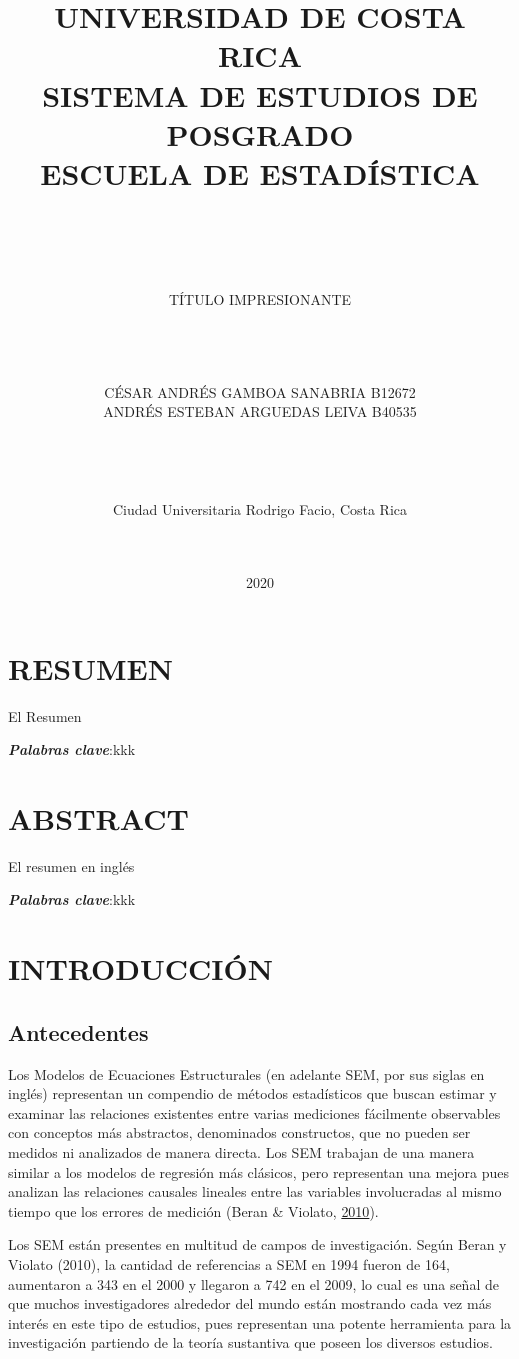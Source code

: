 \documentclass[
]{article}
\title{UNIVERSIDAD DE COSTA RICA\\
SISTEMA DE ESTUDIOS DE POSGRADO\\
ESCUELA DE ESTADÍSTICA\\
~\\
~\\}
\subtitle{TÍTULO IMPRESIONANTE\\
~\\
~\\
~\\}
\author{CÉSAR ANDRÉS GAMBOA SANABRIA B12672\\
ANDRÉS ESTEBAN ARGUEDAS LEIVA B40535\\
~\\
~\\
~\\
~\\
Ciudad Universitaria Rodrigo Facio, Costa Rica\\
~\\
~\\}
\date{2020}
\begin{document}
\maketitle

\cleardoublepage

\newpage

\section*{RESUMEN}

El Resumen

\textbf{\emph{Palabras clave}}:kkk \cleardoublepage

\section*{ABSTRACT}

El resumen en inglés

\textbf{\emph{Palabras clave}}:kkk \cleardoublepage

\newpage

\tableofcontents
\cleardoublepage
{}

\newpage

\section{INTRODUCCIÓN}

\subsection{Antecedentes}

Los Modelos de Ecuaciones Estructurales (en adelante SEM, por sus siglas
en inglés) representan un compendio de métodos estadísticos que buscan
estimar y examinar las relaciones existentes entre varias mediciones
fácilmente observables con conceptos más abstractos, denominados
constructos, que no pueden ser medidos ni analizados de manera directa.
Los SEM trabajan de una manera similar a los modelos de regresión más
clásicos, pero representan una mejora pues analizan las relaciones
causales lineales entre las variables involucradas al mismo tiempo que
los errores de medición (Beran \& Violato,
\protect\hyperlink{ref-Beran2010StructuralEM}{2010}).

Los SEM están presentes en multitud de campos de investigación. Según
Beran y Violato (2010), la cantidad de referencias a SEM en 1994 fueron
de 164, aumentaron a 343 en el 2000 y llegaron a 742 en el 2009, lo cual
es una señal de que muchos investigadores alrededor del mundo están
mostrando cada vez más interés en este tipo de estudios, pues
representan una potente herramienta para la investigación partiendo de
la teoría sustantiva que poseen los diversos estudios.
\end{document}
